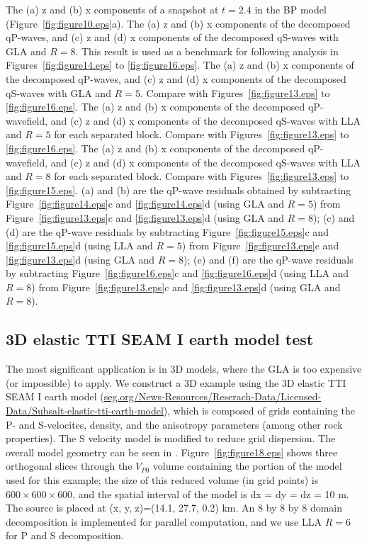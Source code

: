 \documentclass[manuscript,ulem,graphix,revised]{geophysics}
\begin{document}
{
The (a) z and (b) x components of a snapshot at $t=2.4$ in the BP model (Figure~\ref{fig:figure10.eps}a).
}
{
The (a) z and (b) x components of the decomposed qP-waves, and (c) z and (d) x components of the decomposed qS-waves with GLA and $R=8$. This result is used as a benchmark for following analysis in Figures~\ref{fig:figure14.eps} to \ref{fig:figure16.eps}.
}
{
The (a) z and (b) x components of the decomposed qP-waves, and (c) z and (d) x components of the decomposed qS-waves with GLA and $R=5$. Compare with Figures~\ref{fig:figure13.eps} to \ref{fig:figure16.eps}.
}
{
The (a) z and (b) x components of the decomposed qP-wavefield, and (c) z and (d) x components of the decomposed qS-waves with LLA and $R=5$ for each separated block. Compare with Figures~\ref{fig:figure13.eps} to \ref{fig:figure16.eps}.
}
{
The (a) z and (b) x components of the decomposed qP-wavefield, and (c) z and (d) x components of the decomposed qS-waves with LLA and $R=8$ for each separated block. Compare with Figures~\ref{fig:figure13.eps} to \ref{fig:figure15.eps}.
}
{
(a) and (b) are the qP-wave residuals obtained by subtracting Figure~\ref{fig:figure14.eps}c and \ref{fig:figure14.eps}d (using GLA and $R=5$) from Figure~\ref{fig:figure13.eps}c and \ref{fig:figure13.eps}d (using GLA and $R=8$); 
(c) and (d) are the qP-wave residuals by subtracting Figure~\ref{fig:figure15.eps}c and \ref{fig:figure15.eps}d (using LLA and $R=5$) from Figure~\ref{fig:figure13.eps}c and \ref{fig:figure13.eps}d (using GLA and $R=8$);
(e) and (f) are the qP-wave residuals by subtracting Figure~\ref{fig:figure16.eps}c and \ref{fig:figure16.eps}d (using LLA and $R=8$) from Figure~\ref{fig:figure13.eps}c and \ref{fig:figure13.eps}d (using GLA and $R=8$).
}


\subsection{3D elastic TTI SEAM I earth model test}
\indent\indent
The most significant application is in 3D models, where the GLA is too expensive (or impossible) to apply. We construct a 3D example using the 3D elastic TTI SEAM I earth model    (\url{seg.org/News-Resources/Reserach-Data/Licensed-Data/Subsalt-elastic-tti-earth-model}), which is composed of grids containing the P- and S-velocites, density, and the anisotropy parameters (among other rock properties). The S velocity model is modified to reduce grid dispersion. The overall model geometry can be seen in \citet{fehler11}. Figure~\ref{fig:figure18.eps} shows three orthogonal slices through the $V_{P0}$ volume containing the portion of the model used for this example; the size of this reduced volume (in grid points) is $600\times 600 \times 600$, and the spatial interval of the model is dx = dy = dz = 10 m. The source is placed at (x, y, z)=(14.1, 27.7, 0.2) km. An 8 by 8 by 8 domain decomposition is implemented for parallel computation, and we use LLA $R=6$ for P and S decomposition. 
\end{document}
